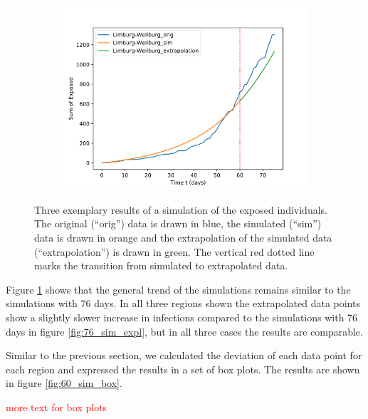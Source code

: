\begin{figure}
\begin{subfigure}[b]{0.3\textwidth}
		\includegraphics[width=\textwidth]{./figures/60d/10_Limburg-Weilburg.png}	
		\caption{}
	\end{subfigure}
	\caption{Three exemplary results of a simulation of the exposed individuals. The original (``orig'') data is drawn in blue,
		the simulated (``sim'') data is drawn in orange and the extrapolation of the simulated data (``extrapolation'') is
		drawn in green. The vertical red dotted line marks the transition from simulated to extrapolated data.
		}
	\label{fig:60_sim_expl}
\end{figure}

Figure \ref*{fig:60_sim_expl} shows that the general trend of the simulations remains similar to the simulations with 76 days.
In all three regions shown the extrapolated data points show a slightly slower increase in infections compared to the simulations
with 76 days in figure \ref*{fig:76_sim_expl}, but in all three cases the results are comparable.

Similar to the previous section, we calculated the deviation of each data point for each region and expressed the results in a
set of box plots. The results are shown in figure \ref*{fig:60_sim_box}.


\textcolor{red}{more text for box plots}



